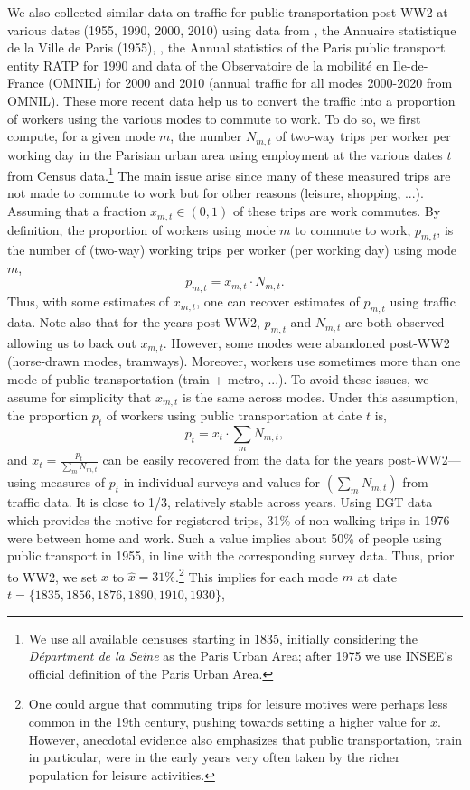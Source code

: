 \documentclass[11pt]{report}
\begin{document}
We also collected similar data on traffic for public transportation post-WW2 at various dates (1955, 1990, 2000, 2010) using data from \cite{bastie1958population}, the Annuaire statistique de la Ville de Paris (1955), \cite{merlin1997transports}, the Annual statistics of the Paris public transport entity RATP for 1990 and data of the Observatoire de la mobilit\'e en Ile-de-France (OMNIL) for 2000 and 2010 (annual traffic for all modes 2000-2020 from OMNIL). These more recent data help us to convert the traffic into a proportion of workers using the various modes to commute to work. To do so, we first compute, for a given mode $m$, the number $N_{m,t}$ of two-way trips per worker per working day in the Parisian urban area using employment at the various dates $t$ from Census data.\footnote{We use all available censuses starting in 1835, initially considering the \emph{D\'epartment de la Seine} as the Paris Urban Area; after 1975 we use INSEE's official definition of the Paris Urban Area.} The main issue arise since many of these measured trips are not made to commute to work but for other reasons (leisure, shopping, ...). Assuming that a fraction $x_{m,t} \in (0,1)$ of these trips are work commutes. By definition, the proportion of workers using mode $m$ to commute to work, $p_{m,t}$, is the number of (two-way) working trips per worker (per working day) using mode $m$,
\begin{equation*}
p_{m,t}=x_{m,t} \cdot N_{m,t}.
\end{equation*}
Thus, with some estimates of $x_{m,t}$, one can recover estimates of $p_{m,t}$ using traffic data. Note also that for the years post-WW2, $p_{m,t}$ and $N_{m,t}$ are both observed allowing us to back out $x_{m,t}$. However, some modes were abandoned post-WW2 (horse-drawn modes, tramways). Moreover, workers use sometimes more than one mode of public transportation (train + metro, ...). To avoid these issues, we assume for simplicity that $x_{m,t}$ is the same across modes. Under this assumption, the proportion $p_t$ of workers using public transportation at date $t$ is,
\begin{equation*}
p_{t}=x_t \cdot \sum_m N_{m,t},
\end{equation*}  
and $x_t=\frac{p_{t}}{\sum_m N_{m,t}}$ can be easily recovered from the data for the years post-WW2---using measures of $p_{t}$ in individual surveys and values for $(\sum_m N_{m,t})$ from traffic data. It is close to 1/3, relatively stable across years. Using EGT data which provides the motive for registered trips, 31\% of non-walking trips in 1976 were between home and work. Such a value implies about 50\% of people using public transport in 1955, in line with the corresponding survey data. Thus, prior to WW2, we set $x$ to $\hat{x}=31\%$.\footnote{One could argue that commuting trips for leisure motives were perhaps less common in the 19th century, pushing towards setting a higher value for $x$. However, anecdotal evidence also emphasizes that public transportation, train in particular, were in the early years very often taken by the richer population for leisure activities.} This implies for each mode $m$ at date $t=\{1835, 1856, 1876, 1890, 1910, 1930\}$,
\end{document}

